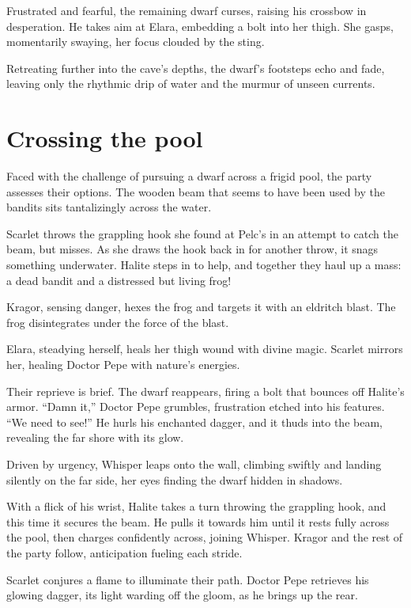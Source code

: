 \documentclass[
  letterpaper,12pt,twoside,twocolumn,openany,
  nodeprecatedcode,bg=full]{dndbook}
\begin{document}
Frustrated and fearful, the remaining dwarf curses, raising his crossbow
in desperation. He takes aim at Elara, embedding a bolt into her thigh.
She gasps, momentarily swaying, her focus clouded by the sting.

Retreating further into the cave's depths, the dwarf's footsteps echo
and fade, leaving only the rhythmic drip of water and the murmur of
unseen currents.

\section{Crossing the pool}\label{crossing-the-pool}

Faced with the challenge of pursuing a dwarf across a frigid pool, the
party assesses their options. The wooden beam that seems to have been
used by the bandits sits tantalizingly across the water.

Scarlet throws the grappling hook she found at Pelc's in an attempt to
catch the beam, but misses. As she draws the hook back in for another
throw, it snags something underwater. Halite steps in to help, and
together they haul up a mass: a dead bandit and a distressed but living
frog!

Kragor, sensing danger, hexes the frog and targets it with an eldritch
blast. The frog disintegrates under the force of the blast.

Elara, steadying herself, heals her thigh wound with divine magic.
Scarlet mirrors her, healing Doctor Pepe with nature's energies.

Their reprieve is brief. The dwarf reappears, firing a bolt that bounces
off Halite's armor. ``Damn it,'' Doctor Pepe grumbles, frustration
etched into his features. ``We need to see!'' He hurls his enchanted
dagger, and it thuds into the beam, revealing the far shore with its
glow.

Driven by urgency, Whisper leaps onto the wall, climbing swiftly and
landing silently on the far side, her eyes finding the dwarf hidden in
shadows.

With a flick of his wrist, Halite takes a turn throwing the grappling
hook, and this time it secures the beam. He pulls it towards him until
it rests fully across the pool, then charges confidently across, joining
Whisper. Kragor and the rest of the party follow, anticipation fueling
each stride.

Scarlet conjures a flame to illuminate their path. Doctor Pepe retrieves
his glowing dagger, its light warding off the gloom, as he brings up the
rear.
\end{document}

